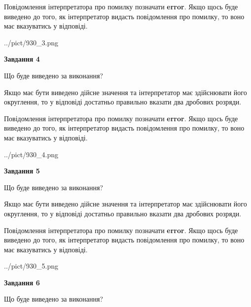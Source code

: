\documentclass[12pt, ukrainian]{article}
\begin{document}
{\begin {Large}
Повідомлення інтерпретатора про помилку позначати \textbf{error}.
Якщо щось буде виведено до того, як інтерпретатор видасть повідомлення про помилку, 
то воно має вказуватись у відповіді. \par

\begin{center}
	{../pict/930_3.png}
\end{center}
\newpage

{\begin {center}\textbf{Завдання 4}\end {center}}\par
Що буде виведено за виконання? \par

Якщо має бути виведено дійсне значення та інтерпретатор має здійснювати його округлення, 
то у відповіді достатньо правильно вказати два дробових розряди.

Повідомлення інтерпретатора про помилку позначати \textbf{error}.
Якщо щось буде виведено до того, як інтерпретатор видасть повідомлення про помилку, 
то воно має вказуватись у відповіді. \par

\begin{center}
	{../pict/930_4.png}
\end{center}
\newpage

{\begin {center}\textbf{Завдання 5}\end {center}}\par
Що буде виведено за виконання? \par

Якщо має бути виведено дійсне значення та інтерпретатор має здійснювати його округлення, 
то у відповіді достатньо правильно вказати два дробових розряди.

Повідомлення інтерпретатора про помилку позначати \textbf{error}.
Якщо щось буде виведено до того, як інтерпретатор видасть повідомлення про помилку, 
то воно має вказуватись у відповіді. \par

\begin{center}
	{../pict/930_5.png}
\end{center}
\newpage

{\begin {center}\textbf{Завдання 6}\end {center}}\par
Що буде виведено за виконання? \par


\end{Large}}
\end{document}
